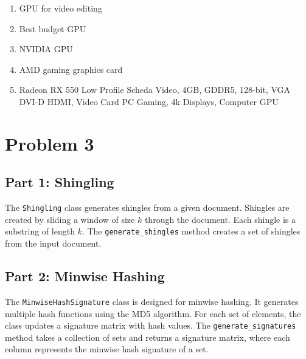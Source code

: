 {\begin{enumerate}
			
			\item GPU for video editing
			
			
			\item Best budget GPU

			
			\item NVIDIA GPU
			
			\item AMD gaming graphics card
			
			
			\item Radeon RX 550 Low Profile Scheda Video, 4GB, GDDR5, 128-bit, VGA DVI-D HDMI, Video Card PC Gaming, 4k Displays, Computer GPU
		
			
		\end{enumerate}
	}
	\newpage
	\section*{Problem 3}\label{sec:prob-3}
	\subsection*{Part 1: Shingling}
	The \texttt{Shingling} class generates shingles from a given document. Shingles are created by sliding a window of size $k$ through the document. Each shingle is a substring of length $k$. The \texttt{generate\_shingles} method creates a set of shingles from the input document.
	
	\subsection*{Part 2: Minwise Hashing}
	The \texttt{MinwiseHashSignature} class is designed for minwise hashing. It generates multiple hash functions using the MD5 algorithm. For each set of elements, the class updates a signature matrix with hash values. The \texttt{generate\_signatures} method takes a collection of sets and returns a signature matrix, where each column represents the minwise hash signature of a set.
	
